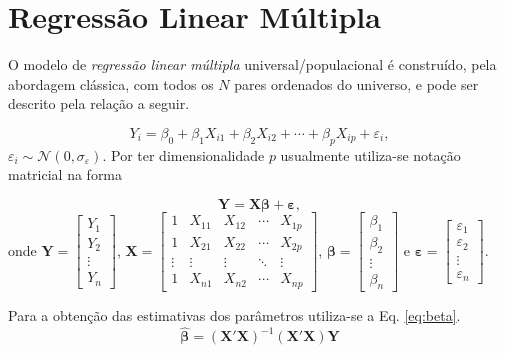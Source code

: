 \documentclass[
]{book}
\theoremstyle{definition}
\theoremstyle{definition}
\theoremstyle{definition}
\theoremstyle{remark}
\begin{document}
\hypertarget{regressuxe3o-linear-muxfaltipla}{%
\section{Regressão Linear Múltipla}\label{regressuxe3o-linear-muxfaltipla}}

O modelo de \emph{regressão linear múltipla} universal/populacional é construído, pela abordagem clássica, com todos os \(N\) pares ordenados do universo, e pode ser descrito pela relação a seguir.

\begin{equation}
Y_i = \beta_0 + \beta_1 X_{i1} + \beta_2 X_{i2} + \cdots + \beta_p X_{ip} + \varepsilon_i,
\label{eq:rlm}
\end{equation}
\(\varepsilon_i \sim \mathcal{N}(0,\sigma_{\varepsilon})\). Por ter dimensionalidade \(p\) usualmente utiliza-se notação matricial na forma

\begin{equation}
\boldsymbol{Y} = \boldsymbol{X} \boldsymbol{\beta} + \boldsymbol{\varepsilon},
\label{eq:rlm2}
\end{equation}
onde \(\boldsymbol{Y} = \begin{bmatrix} Y_1 \\ Y_2 \\ \vdots \\ Y_n \end{bmatrix}\), \(\boldsymbol{X} = \begin{bmatrix} 1 & X_{11} & X_{12} & \cdots & X_{1p} \\ 1 & X_{21} & X_{22} & \cdots & X_{2p} \\ \vdots & \vdots & \vdots & \ddots & \vdots \\ 1 & X_{n1} & X_{n2} & \cdots & X_{np} \end{bmatrix}\), \(\boldsymbol{\beta} = \begin{bmatrix} \beta_1 \\ \beta_2 \\ \vdots \\ \beta_n \end{bmatrix}\) e \(\boldsymbol{\varepsilon} = \begin{bmatrix} \varepsilon_1 \\ \varepsilon_2 \\ \vdots \\ \varepsilon_n \end{bmatrix}\).

Para a obtenção das estimativas dos parâmetros utiliza-se a Eq. \eqref{eq:beta}.
\begin{equation}
\boldsymbol{\hat{\beta}} = (\boldsymbol{X'X})^{-1} (\boldsymbol{X'X}) \boldsymbol{Y}
\label{eq:beta}
\end{equation}
\end{document}
